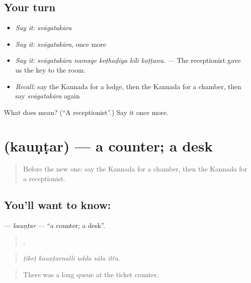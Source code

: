 \subsection*{Your turn}
\begin{itemize}
\raggedright
  \item \emph{Say it:} \emph{svāgatakāra}
  \item \emph{Say it:} \emph{svāgatakāra}, once more
  \item \emph{Say it:} \emph{svāgatakāra namage koṭhaḍiya kīli koṭṭanu.} — The receptionist gave us the key to the room.
  \item \emph{Recall:} say the Kannada for a lodge, then the Kannada for a chamber, then say \emph{svāgatakāra} again
\end{itemize}

\begin{tcolorbox}[breakable,colback=teal!4,colframe=teal!35!black,title={Before you move on}]
What does  mean? (\textquotedblleft{}A receptionist\textquotedblright{}.) Say it once more.
\end{tcolorbox}
\section[\texorpdfstring{\kn{ಕೌಂಟರ್} (kauṇṭar)}{ಕೌಂಟರ್ (kauṇṭar)}]{ (kauṇṭar) — a counter; a desk}

\label{lesson:KA-C460-kauntar}



\begin{quote}
Before the new one: say the Kannada for a chamber, then the Kannada for a receptionist.
\end{quote}

\subsection*{You'll want to know: }
\textbf{} — \emph{kauṇṭar} — \textquotedblleft{}a counter; a desk\textquotedblright{}.

\begin{quote}
    .
\end{quote}

\begin{quote}
\emph{ṭikeṭ kauṇṭarnalli udda sālu ittu.}
\end{quote}

\begin{quote}
There was a long queue at the ticket counter.
\end{quote}

